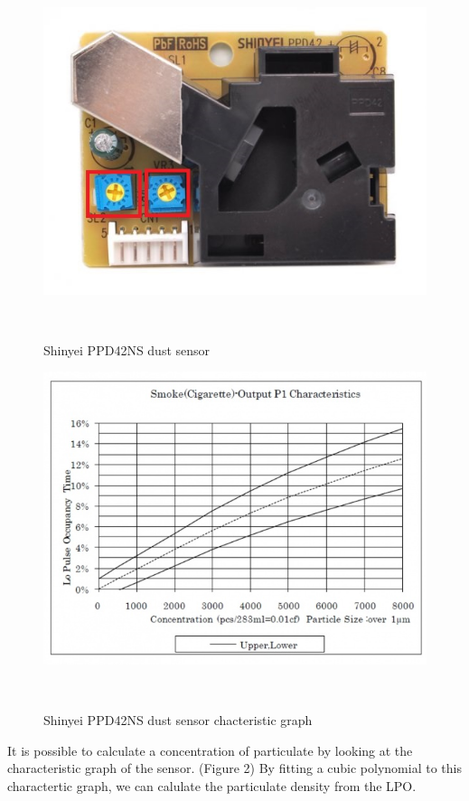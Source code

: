 \documentclass{sigchi}
\begin{document}
\begin{figure}
\centering
  \includegraphics[width=1\columnwidth]{figures/sensor}
  \caption{ Shinyei PPD42NS dust sensor }~\label{fig:figure1}
\end{figure}

\begin{figure}
\centering
  \includegraphics[width=1\columnwidth]{figures/characteristics}
  \caption{ Shinyei PPD42NS dust sensor chacteristic graph}~\label{fig:figure2}
\end{figure}

It is possible to calculate a concentration of particulate by looking
at the characteristic graph of the sensor. (Figure 2) By fitting a cubic polynomial
to this charactertic graph, we can calulate the particulate density from the LPO.
\end{document}
